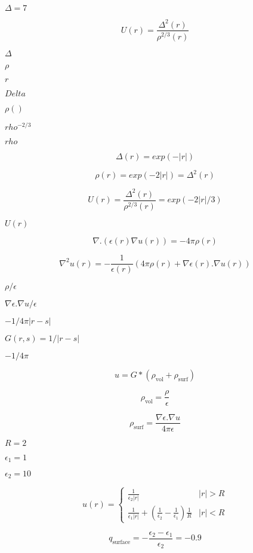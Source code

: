\documentclass{article}
\begin{document}
$\Delta=7$
\pagebreak

\[ U(r) = \frac{\Delta^2 (r)}{\rho^{2/3} (r)} \]
\pagebreak

$ \Delta $
\pagebreak

$ \rho $
\pagebreak

$ r $
\pagebreak

$ Delta $
\pagebreak

$ \rho() $
\pagebreak

$ rho^{-2/3} $
\pagebreak

$ rho $
\pagebreak

\[ \Delta(r) = exp(- | r | ) \]
\pagebreak

\[ \rho(r) = exp(- 2 | r | ) = \Delta^2(r) \]
\pagebreak

\[ U(r) = \frac{\Delta^2 (r)}{\rho^{2/3} (r)} = exp( - 2 | r | / 3) \]
\pagebreak

$ U(r) $
\pagebreak

\[ \nabla . \left( \epsilon(r) \nabla u(r) \right) = - 4 \pi \rho(r) \]
\pagebreak

\[ \nabla^2 u(r) = - \frac{1}{\epsilon(r)} \left( 4 \pi \rho(r) + \nabla \epsilon(r) . \nabla u(r) \right) \]
\pagebreak

$\rho / \epsilon$
\pagebreak

$\nabla \epsilon . \nabla u / \epsilon$
\pagebreak

$-1 / 4 \pi |r-s|$
\pagebreak

$G(r,s) = 1/|r-s|$
\pagebreak

$-1/4\pi$
\pagebreak

\[ u = G * \left(\rho_{\mbox{vol}} + \rho_{\mbox{surf}} \right) \]
\pagebreak

\[ \rho_{\mbox{vol}} = \frac{\rho}{\epsilon} \]
\pagebreak

\[ \rho_{\mbox{surf}} = \frac{\nabla \epsilon . \nabla u}{4 \pi \epsilon} \]
\pagebreak

$R=2$
\pagebreak

$\epsilon_1 = 1$
\pagebreak

$\epsilon_2 = 10$
\pagebreak

\[ u(r) = \left \lbrace \begin{array}{cc} \frac{1}{\epsilon_2 |r|} & |r| > R \\ \frac{1}{\epsilon_1 |r|} + \left( \frac{1}{\epsilon_2} - \frac{1}{\epsilon_1} \right) \frac{1}{R} & |r| < R \end{array} \right . \]
\pagebreak

\[ q_{\mbox{surface}} = -\frac{\epsilon_2 - \epsilon_1}{\epsilon_2} = -0.9 \]
\pagebreak
\end{document}

